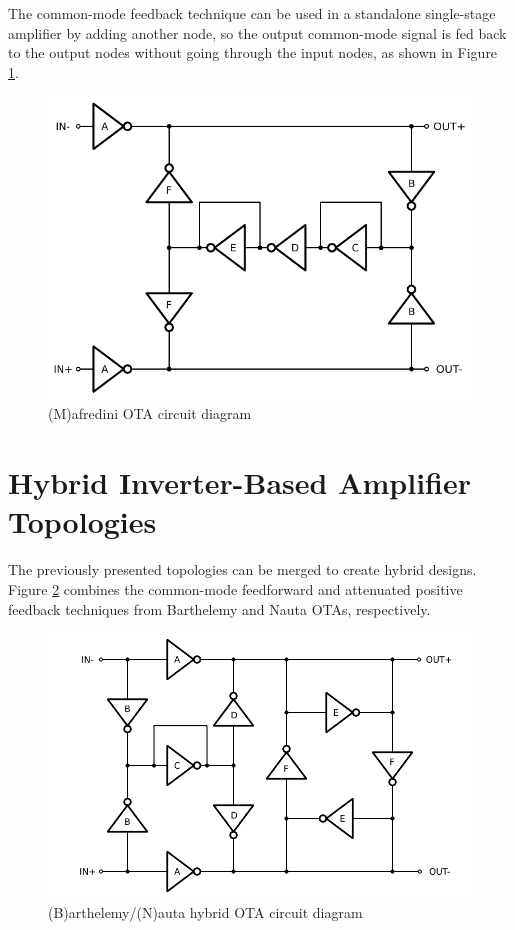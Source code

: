 \documentclass[conference]{IEEEtran}
\begin{document}
 The common-mode feedback technique can be used in a standalone single-stage amplifier \cite{manfredini2020ultra} by adding another node, so the output common-mode signal is fed back to the output nodes without going through the input nodes, as shown in Figure \ref{fig:manf:sch}.
 
\begin{figure}[!htbp]
	\centerline{\includegraphics[scale=0.50]{circuits/manf.pdf}}
	\caption{(M)afredini OTA circuit diagram \cite{manfredini2020ultra}}
	\label{fig:manf:sch}
\end{figure}


\section{Hybrid Inverter-Based Amplifier Topologies}\label{sc:hybrid}

The previously presented topologies can be merged to create hybrid designs. Figure \ref{fig:barthnauta:sch} combines the common-mode feedforward and attenuated positive feedback techniques from Barthelemy and Nauta OTAs, respectively.

\begin{figure}[!htbp]
	\centerline{\includegraphics[scale=0.50]{circuits/barthnauta.pdf}}
	\caption{(B)arthelemy/(N)auta hybrid OTA circuit diagram}
	\label{fig:barthnauta:sch}
\end{figure}
\end{document}
